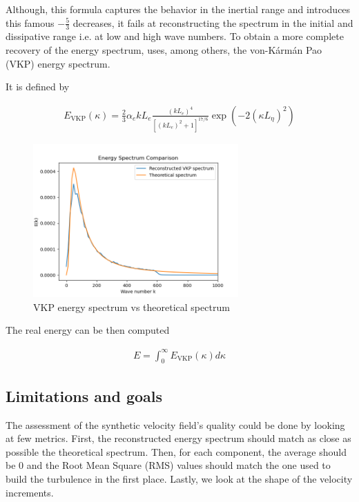 \documentclass[a4paper,12pt]{article}
\theoremstyle{definition}
\begin{document}
Although, this formula captures the behavior in the inertial range and introduces this famous $-\frac{5}{3}$ decreases, it fails at reconstructing the spectrum in the initial and dissipative range i.e. at low and high wave numbers. To obtain a more complete recovery of the energy spectrum, \cite{Janin2021} uses, among others, the von-Kármán Pao (VKP) energy spectrum.
\bigskip

It is defined by 

\begin{align}
    E_{\text{VKP}}(\kappa)=\frac{2}{3}\alpha_e k L_e \frac{(kL_e)^4}{[(kL_e)^2+1]^{17/6}}\exp(-2(\kappa L_\eta)^2)
\end{align}

\begin{figure}[H]
    \centering
    \includegraphics[width=0.7\textwidth]{illustrations/Energy_Spectrum_VKP.png}
    \caption{VKP energy spectrum vs theoretical spectrum}
    \label{VKPspectrum}
\end{figure}

The real energy can be then computed 

\begin{align}
    E = \int_{0}^{\infty}E_{\text{VKP}}(\kappa) d\kappa
\end{align}

\subsection{Limitations and goals}
The assessment of the synthetic velocity field's quality could be done by looking at few metrics. First, the reconstructed energy spectrum should match as close as possible the theoretical spectrum. Then, for each component, the average should be 0 and the Root Mean Square (RMS) values should match the one used to build the turbulence in the first place. Lastly, we look at the shape of the velocity increments. \\
\end{document}
